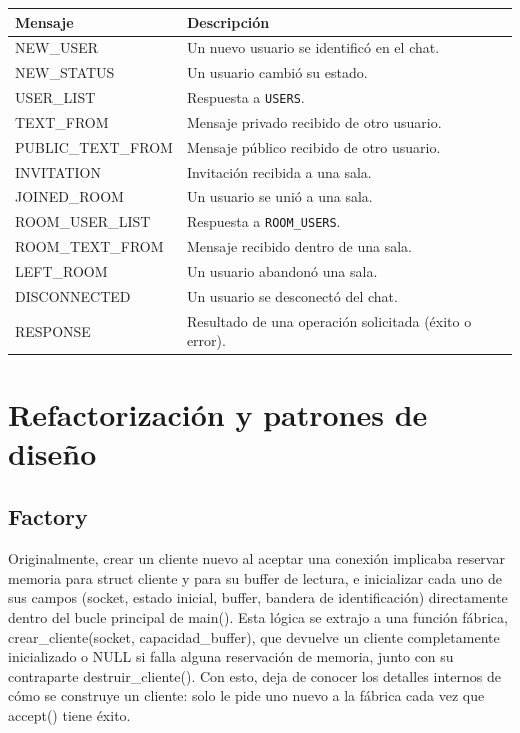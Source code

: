 \documentclass[12pt,a4paper]{article}
\begin{document}
\begin{table}[H]
    \centering
    \begin{tabular}{@{}ll@{}}
        \toprule
        \textbf{Mensaje} & \textbf{Descripción} \\
        \midrule
        NEW\_USER & Un nuevo usuario se identificó en el chat. \\
        NEW\_STATUS & Un usuario cambió su estado. \\
        USER\_LIST & Respuesta a \texttt{USERS}. \\
        TEXT\_FROM & Mensaje privado recibido de otro usuario. \\
        PUBLIC\_TEXT\_FROM & Mensaje público recibido de otro usuario. \\
        INVITATION & Invitación recibida a una sala. \\
        JOINED\_ROOM & Un usuario se unió a una sala. \\
        ROOM\_USER\_LIST & Respuesta a \texttt{ROOM\_USERS}. \\
        ROOM\_TEXT\_FROM & Mensaje recibido dentro de una sala. \\
        LEFT\_ROOM & Un usuario abandonó una sala. \\
        DISCONNECTED & Un usuario se desconectó del chat. \\
        RESPONSE & Resultado de una operación solicitada (éxito o error). \\
        \bottomrule
    \end{tabular}
    \label{tab:notificaciones}
\end{table}

\section{Refactorización y patrones de diseño}
\subsection{Factory}
Originalmente, crear un cliente nuevo al aceptar una conexión implicaba
reservar memoria para struct cliente y para su buffer de lectura,
e inicializar cada uno de sus campos (socket, estado inicial, buffer,
bandera de identificación) directamente dentro del bucle principal de
main(). Esta lógica se extrajo a una función fábrica,
crear\_cliente(socket, capacidad\_buffer), que
devuelve un cliente completamente inicializado o NULL si falla
alguna reservación de memoria, junto con su contraparte
destruir\_cliente(). Con esto, deja de conocer los
detalles internos de cómo se construye un cliente: solo le pide uno nuevo a
la fábrica cada vez que accept() tiene éxito.
\end{document}
